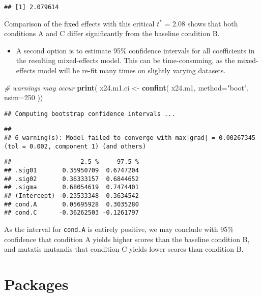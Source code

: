 \documentclass[]{book}
\newenvironment{Shaded}{\begin{snugshade}}{\end{snugshade}}
\newcommand{\CommentTok}[1]{\textcolor[rgb]{0.56,0.35,0.01}{\textit{#1}}}
\newcommand{\DataTypeTok}[1]{\textcolor[rgb]{0.13,0.29,0.53}{#1}}
\newcommand{\DecValTok}[1]{\textcolor[rgb]{0.00,0.00,0.81}{#1}}
\newcommand{\KeywordTok}[1]{\textcolor[rgb]{0.13,0.29,0.53}{\textbf{#1}}}
\newcommand{\NormalTok}[1]{#1}
\newcommand{\StringTok}[1]{\textcolor[rgb]{0.31,0.60,0.02}{#1}}
\providecommand{\tightlist}{%
  \setlength{\itemsep}{0pt}\setlength{\parskip}{0pt}}
\begin{document}
\begin{verbatim}
## [1] 2.079614
\end{verbatim}

Comparison of the fixed effects with this critical \(t^*\) = 2.08 shows that
both conditions A and C differ significantly from the baseline condition
B.

\begin{itemize}
\tightlist
\item
  A second option is to estimate 95\% confidence intervals for all
  coefficients in the resulting mixed-effects model. This can be
  time-consuming, as the mixed-effects model will be re-fit many times on
  slightly varying datasets.
\end{itemize}

\begin{Shaded}
\begin{Highlighting}[]
\CommentTok{# warnings may occur}
\KeywordTok{print}\NormalTok{( x24.m1.ci <-}\StringTok{ }\KeywordTok{confint}\NormalTok{( x24.m1, }\DataTypeTok{method=}\StringTok{"boot"}\NormalTok{, }\DataTypeTok{nsim=}\DecValTok{250}\NormalTok{ ))}
\end{Highlighting}
\end{Shaded}

\begin{verbatim}
## Computing bootstrap confidence intervals ...
\end{verbatim}

\begin{verbatim}
## 
## 6 warning(s): Model failed to converge with max|grad| = 0.00267345 (tol = 0.002, component 1) (and others)
\end{verbatim}

\begin{verbatim}
##                   2.5 %     97.5 %
## .sig01       0.35950709  0.6747204
## .sig02       0.36333157  0.6844652
## .sigma       0.68054619  0.7474401
## (Intercept) -0.23533348  0.3634542
## cond.A       0.05695928  0.3035280
## cond.C      -0.36262503 -0.1261797
\end{verbatim}

As the interval for \texttt{cond.A} is entirely
positive, we may conclude with 95\% confidence that condition A yields
higher scores than the baseline condition B, and mutatis mutandis that
condition C yields lower scores than condition B.

\hypertarget{ch:packages}{%
\chapter{Packages}\label{ch:packages}}
\end{document}
